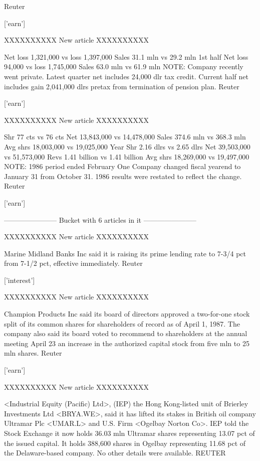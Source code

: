 \documentclass{article}
\begin{document}
\begin{pythonOutput}
 Reuter

['earn']

XXXXXXXXXX
New article
XXXXXXXXXX

Net loss 1,321,000 vs loss 1,397,000
    Sales 31.1 mln vs 29.2 mln
    1st half
    Net loss 94,000 vs loss 1,745,000
    Sales 63.0 mln vs 61.9 mln
    NOTE: Company recently went private.
    Latest quarter net includes 24,000 dlr tax credit.
    Current half net includes gain 2,041,000 dlrs pretax from
termination of pension plan.
 Reuter

['earn']

XXXXXXXXXX
New article
XXXXXXXXXX

Shr 77 cts vs 76 cts
    Net 13,843,000 vs 14,478,000
    Sales 374.6 mln vs 368.3 mln
    Avg shrs 18,003,000 vs 19,025,000
    Year
    Shr 2.16 dlrs vs 2.65 dlrs
    Net 39,503,000 vs 51,573,000
    Revs 1.41 billion vs 1.41 billion
    Avg shrs 18,269,000 vs 19,497,000
    NOTE: 1986 period ended February One
    Company changed fiscal yearend to January 31 from October
31. 1986 results were restated to reflect the change.
 Reuter

['earn']

-----------------------
Bucket with 6 articles in it
-----------------------


XXXXXXXXXX
New article
XXXXXXXXXX

Marine Midland Banks Inc said it is
raising its prime lending rate to 7-3/4 pct from 7-1/2 pct,
effective immediately.
 Reuter

['interest']

XXXXXXXXXX
New article
XXXXXXXXXX

Champion Products Inc said its
board of directors approved a two-for-one stock split of its
common shares for shareholders of record as of April 1, 1987.
    The company also said its board voted to recommend to
shareholders at the annual meeting April 23 an increase in the
authorized capital stock from five mln to 25 mln shares.
 Reuter

['earn']

XXXXXXXXXX
New article
XXXXXXXXXX

<Industrial Equity (Pacific) Ltd>,
(IEP) the Hong Kong-listed unit of Brierley Investments Ltd
<BRYA.WE>, said it has lifted its stakes in British oil company
Ultramar Plc <UMAR.L> and U.S. Firm <Ogelbay Norton Co>.
    IEP told the Stock Exchange it now holds 36.03 mln Ultramar
shares representing 13.07 pct of the issued capital. It holds
388,600 shares in Ogelbay representing 11.68 pct of the
Delaware-based company.
    No other details were available.
 REUTER


\end{pythonOutput}
\end{document}
